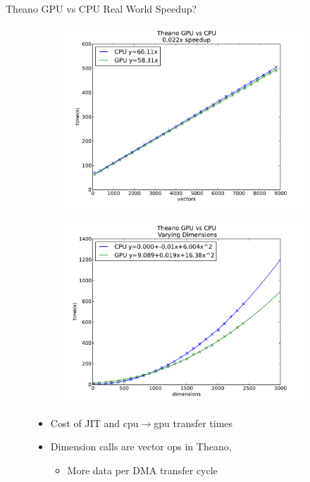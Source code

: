 \documentclass{beamer}
\begin{document}
\begin{frame}{Theano GPU vs CPU}
Real World Speedup?
   \begin{figure}
   \begin{subfigure}
  \centering \includegraphics[scale=.25]{doc/gpucpu}
  \end{subfigure}
  \begin{subfigure}
  \centering \includegraphics[scale=.25]{doc/gpucpuD}
   \end{subfigure}
   \begin{itemize}
    \item Cost of JIT and cpu$\rightarrow$gpu transfer times
    \item Dimension calls are vector ops in Theano,
    \begin{itemize}
      \item More data per DMA transfer cycle
     \end{itemize}
   \end{itemize}
  \end{figure}

\end{frame}
\end{document}
